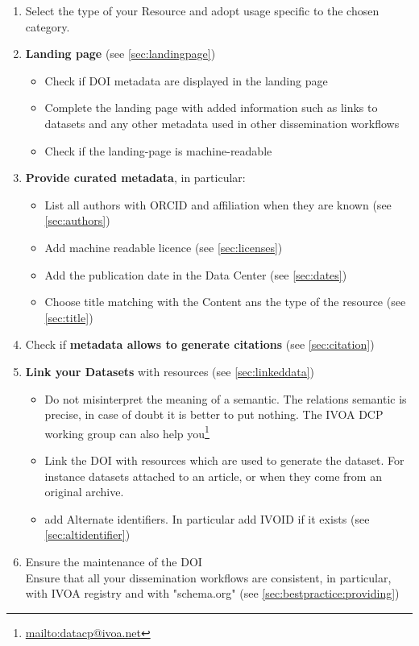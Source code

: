 \documentclass[11pt,a4paper]{ivoa}
\begin{document}
\begin{enumerate}
	\item Select the type of your Resource and adopt usage specific to the chosen category.
	\item \textbf{Landing page} (see \ref{sec:landingpage})
	\begin{itemize}
		\item Check if DOI metadata are displayed in the landing page 
		\item Complete the landing page with added information such as links to datasets and any other metadata used in other dissemination workflows
		\item Check if the landing-page is machine-readable
	\end{itemize}
	\item \textbf{Provide curated metadata}, in particular:
	\begin{itemize}
		\item List all authors with ORCID and affiliation when they are known (see \ref{sec:authors})
		\item Add machine readable licence (see \ref{sec:licenses})
		\item Add the publication date in the Data Center (see \ref{sec:dates})
		\item Choose title  matching with the Content ans the type of the resource  (see \ref{sec:title})
	\end{itemize}
	\item Check if \textbf{metadata allows to generate citations} (see \ref{sec:citation})
	\item \textbf{Link your Datasets} with resources (see \ref{sec:linkeddata})
	\begin{itemize}	
		\item Do not misinterpret the meaning of a semantic. The relations semantic is precise, in case of doubt it is better to put nothing. 
		The IVOA DCP working group can also help you\footnote{\url{mailto:datacp@ivoa.net}}
		\item Link the DOI with resources which are used to generate the dataset. For instance datasets attached to an article, or when they come from an original archive.
		\item add Alternate identifiers. In particular add IVOID if it exists (see \ref{sec:altidentifier})
	\end{itemize}
	\item Ensure the maintenance of the DOI\\
	Ensure that all your dissemination workflows are consistent, in particular, with IVOA registry and with "schema.org" (see \ref{sec:bestpractice:providing})

\end{enumerate}
\end{document}
